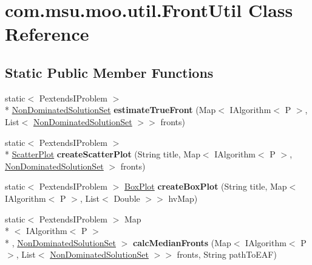 \hypertarget{classcom_1_1msu_1_1moo_1_1util_1_1FrontUtil}{\section{com.\-msu.\-moo.\-util.\-Front\-Util Class Reference}
\label{classcom_1_1msu_1_1moo_1_1util_1_1FrontUtil}
}
\subsection*{Static Public Member Functions}
\begin{DoxyCompactItemize}
\item 
\hypertarget{classcom_1_1msu_1_1moo_1_1util_1_1FrontUtil_a1c7ece73360392eff06a2c4f1a45da86}{static$<$ Pextends\-I\-Problem $>$\\*
 \hyperlink{classcom_1_1msu_1_1moo_1_1model_1_1solution_1_1NonDominatedSolutionSet}{Non\-Dominated\-Solution\-Set} {\bfseries estimate\-True\-Front} (Map$<$ I\-Algorithm$<$ P $>$, List$<$ \hyperlink{classcom_1_1msu_1_1moo_1_1model_1_1solution_1_1NonDominatedSolutionSet}{Non\-Dominated\-Solution\-Set} $>$$>$ fronts)}\label{classcom_1_1msu_1_1moo_1_1util_1_1FrontUtil_a1c7ece73360392eff06a2c4f1a45da86}

\item 
\hypertarget{classcom_1_1msu_1_1moo_1_1util_1_1FrontUtil_a232bcf75274796befbc241c1dcc30889}{static$<$ Pextends\-I\-Problem $>$\\*
 \hyperlink{classcom_1_1msu_1_1moo_1_1visualization_1_1ScatterPlot}{Scatter\-Plot} {\bfseries create\-Scatter\-Plot} (String title, Map$<$ I\-Algorithm$<$ P $>$, \hyperlink{classcom_1_1msu_1_1moo_1_1model_1_1solution_1_1NonDominatedSolutionSet}{Non\-Dominated\-Solution\-Set} $>$ fronts)}\label{classcom_1_1msu_1_1moo_1_1util_1_1FrontUtil_a232bcf75274796befbc241c1dcc30889}

\item 
\hypertarget{classcom_1_1msu_1_1moo_1_1util_1_1FrontUtil_ae6be14fc492457191afc6c9d5af0383e}{static$<$ Pextends\-I\-Problem $>$ \hyperlink{classcom_1_1msu_1_1moo_1_1visualization_1_1BoxPlot}{Box\-Plot} {\bfseries create\-Box\-Plot} (String title, Map$<$ I\-Algorithm$<$ P $>$, List$<$ Double $>$$>$ hv\-Map)}\label{classcom_1_1msu_1_1moo_1_1util_1_1FrontUtil_ae6be14fc492457191afc6c9d5af0383e}

\item 
\hypertarget{classcom_1_1msu_1_1moo_1_1util_1_1FrontUtil_a88acca7b870b4fbff9b31d16f2a03e38}{static$<$ Pextends\-I\-Problem $>$ Map\\*
$<$ I\-Algorithm$<$ P $>$\\*
, \hyperlink{classcom_1_1msu_1_1moo_1_1model_1_1solution_1_1NonDominatedSolutionSet}{Non\-Dominated\-Solution\-Set} $>$ {\bfseries calc\-Median\-Fronts} (Map$<$ I\-Algorithm$<$ P $>$, List$<$ \hyperlink{classcom_1_1msu_1_1moo_1_1model_1_1solution_1_1NonDominatedSolutionSet}{Non\-Dominated\-Solution\-Set} $>$$>$ fronts, String path\-To\-E\-A\-F)}\label{classcom_1_1msu_1_1moo_1_1util_1_1FrontUtil_a88acca7b870b4fbff9b31d16f2a03e38}


\end{DoxyCompactItemize}
